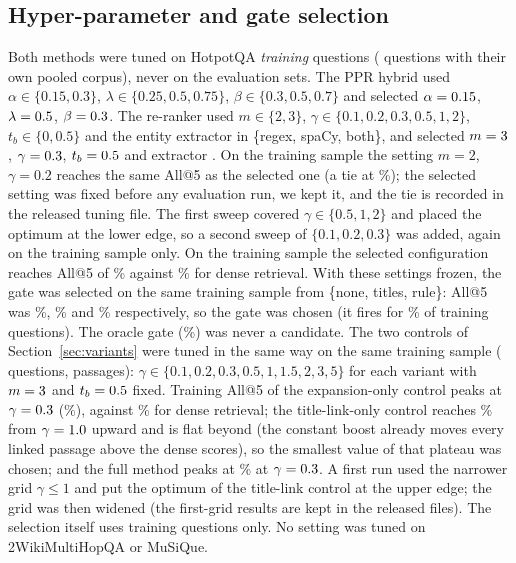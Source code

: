 \documentclass[a4paper,fleqn]{cas-sc}
\begin{document}
\subsection{Hyper-parameter and gate selection}\label{sec:hyper}
Both methods were tuned on HotpotQA \emph{training} questions (\tTuneN{} questions with their own pooled corpus), never on the evaluation sets. The PPR hybrid used $\alpha\in\{0.15,0.3\}$, $\lambda\in\{0.25,0.5,0.75\}$, $\beta\in\{0.3,0.5,0.7\}$ and selected $\alpha=0.15$, $\lambda=0.5$, $\beta=0.3$. The re-ranker used $m\in\{2,3\}$, $\gamma\in\{0.1,0.2,0.3,0.5,1,2\}$, $t_b\in\{0,0.5\}$ and the entity extractor in \{regex, spaCy, both\}, and selected $m=3$, $\gamma=0.3$, $t_b=0.5$ and extractor \texttt{\tTwoNer}. On the training sample the setting $m=2$, $\gamma=0.2$ reaches the same All@5 as the selected one (a tie at \tTwoAll\%); the selected setting was fixed before any evaluation run, we kept it, and the tie is recorded in the released tuning file. The first sweep covered $\gamma\in\{0.5,1,2\}$ and placed the optimum at the lower edge, so a second sweep of $\{0.1,0.2,0.3\}$ was added, again on the training sample only. On the training sample the selected configuration reaches All@5 of \tTwoAll\% against \tTwoDense\% for dense retrieval. With these settings frozen, the gate was selected on the same training sample from \{none, titles, rule\}: All@5 was \GateNoneTrain\%, \GateTitlesTrain\% and \GateRuleTrain\% respectively, so the \texttt{\GateChosen} gate was chosen (it fires for \GateTitlesShare\% of training questions). The oracle gate (\GateOracleTrain\%) was never a candidate. The two controls of Section~\ref{sec:variants} were tuned in the same way on the same training sample (\ClTrainN{} questions, \ClTrainP{} passages): $\gamma\in\{0.1,0.2,0.3,0.5,1,1.5,2,3,5\}$ for each variant with $m=3$ and $t_b=0.5$ fixed. Training All@5 of the expansion-only control peaks at $\gamma=0.3$ (\CtlTrainExpAll\%), against \ClDenseTrain\% for dense retrieval; the title-link-only control reaches \CtlTrainTitAll\% from $\gamma=1.0$ upward and is flat beyond (the constant boost already moves every linked passage above the dense scores), so the smallest value of that plateau was chosen; and the full method peaks at \CtlTrainTwoAll\% at $\gamma=0.3$. A first run used the narrower grid $\gamma\le1$ and put the optimum of the title-link control at the upper edge; the grid was then widened (the first-grid results are kept in the released files). The selection itself uses training questions only. No setting was tuned on 2WikiMultiHopQA or MuSiQue.
\end{document}
